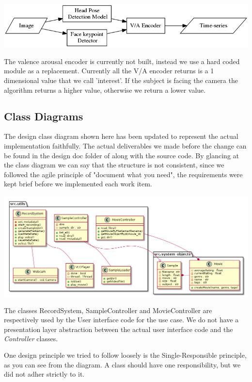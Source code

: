 \documentclass[12pt,a4paper,man]{report}
\begin{document}
\begin{center}
\includegraphics[width=.9\linewidth]{img/begrpipeline.png}
\end{center}

The valence arousal encoder is currently not built, instead we use a hard coded module as a replacement. Currently all the V/A encoder returns is a 1 dimensional value that we call 'interest'. If the subject is facing the camera the algorithm returns a higher value, otherwise we return a lower value.


\subsection{Class Diagrams}
\label{sec:orga0bd8ab}
The design class diagram shown here has been updated to represent the actual implementation faithfully. The actual deliverables we made before the change can be found in the design doc folder of along with the source code. By glancing at the class diagram we can say that the structure is not consistent,  since we followed the agile principle of "document what you need", the requirements were kept brief before we implemented each work item.

\begin{center}
\includegraphics[width=.9\linewidth]{img/class1.png}
\end{center}

The classes RecordSystem, SampleController and MovieController are respectively used by the User interface code for the use case. We do not have a presentation layer abstraction between the actual user interface code and the \emph{Controller} classes.

One design principle we tried to follow loosely is the Single-Responsible principle, as you can see from the diagram. A class should have one responsibility, but we did not adher strictly to it.
\end{document}
